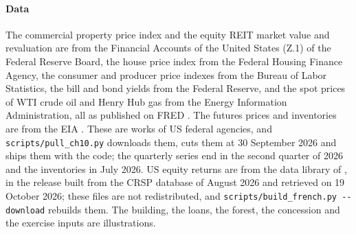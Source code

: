 \begin{chapterrefs}
\paragraph{Data}
The commercial property price index and the equity REIT market value and revaluation are from the
Financial Accounts of the United States (Z.1) of the Federal Reserve Board, the house price index from the
Federal Housing Finance Agency, the consumer and producer price indexes from the Bureau of Labor
Statistics, the bill and bond yields from the Federal Reserve, and the spot prices of WTI crude oil and
Henry Hub gas from the Energy Information Administration, all as published on FRED \parencite{fredch10}. The
futures prices and inventories are from the EIA \parencite{eiach10}. These are works of US federal agencies,
and \texttt{scripts/pull\_ch10.py} downloads them, cuts them at 30 September 2026 and ships them with the
code; the quarterly series end in the second quarter of 2026 and the inventories in July 2026. US equity
returns are from the data library of \textcite{frenchlib}, in the release built from the CRSP database of
August 2026 and retrieved on 19 October 2026; these files are not redistributed, and
\texttt{scripts/build\_french.py -{}-download} rebuilds them. The building, the loans, the forest, the
concession and the exercise inputs are illustrations.

\end{chapterrefs}
